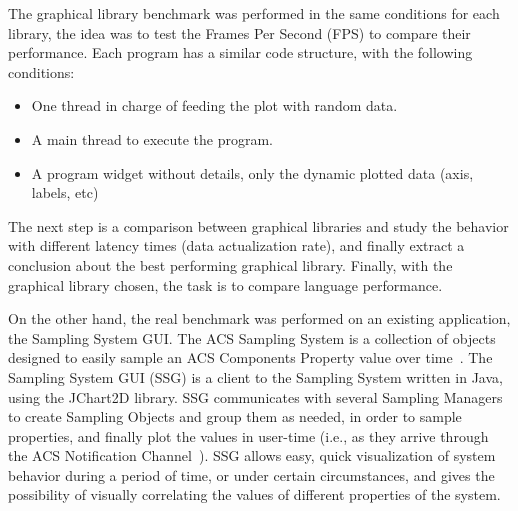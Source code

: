 The graphical library benchmark was performed in the same conditions for each library,
the idea was to test the Frames Per Second (FPS) to compare their performance.
Each program has a similar code structure, with the following conditions:
\begin{itemize}
	\item One thread in charge of feeding the plot with random data.
	\item A main thread to execute the program.
	\item A program widget without details, only the dynamic plotted data (axis, labels, etc)
\end{itemize}
The next step is a comparison between graphical libraries and study
the behavior with different latency times (data actualization rate), and finally
extract a conclusion about the best performing graphical library.
Finally, with the graphical library chosen, the task is to compare language
performance.


On the other hand, the real benchmark was performed on an existing application, the Sampling System GUI.
The ACS Sampling System is a collection of objects designed to easily sample an ACS Components Property
value over time~\cite{acssamp}.
The Sampling System GUI (SSG) is a client to the Sampling System written in Java, using the JChart2D library.
SSG communicates with several Sampling Managers to create Sampling Objects
and group them as needed, in order to sample properties, and finally plot the values
in user-time (i.e., as they arrive through the ACS Notification Channel~\cite{acs:notification_channel}).
SSG allows easy, quick visualization of system behavior during a period of time,
or under certain circumstances, and gives the possibility of visually correlating the values of
different properties of the system.

